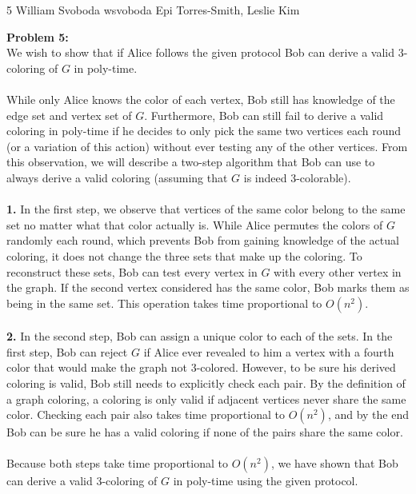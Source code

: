 \documentclass[12pt,letterpaper]{cos340hw}
\begin{document}
           {5}            %
           {William Svoboda}  %
           {wsvoboda}   %
           {Epi Torres-Smith, Leslie Kim} 




\noindent\textbf{Problem 5:}\\
We wish to show that if Alice follows the given protocol Bob can derive a valid 3-coloring of $G$ in 
poly-time.\\\\
While only Alice knows the color of each vertex, Bob still has knowledge of the edge set and vertex set 
of $G$. Furthermore, Bob can still fail to derive a valid coloring in poly-time if he decides to only pick 
the same two vertices each round (or a variation of this action) without ever testing any of the other 
vertices. From this observation, we will describe a two-step algorithm that Bob can use to always 
derive a valid coloring (assuming that $G$ is indeed 3-colorable).\\\\
\noindent\textbf{1.} In the first step, we observe that vertices of the same color belong to the same set 
no matter what that color actually is. While Alice permutes the colors of $G$ randomly each round, which 
prevents Bob from gaining knowledge of the actual coloring, it does not change the three sets that make 
up the coloring. To reconstruct these sets, Bob can test every vertex in $G$ with every other vertex in the 
graph. If the second vertex considered has the same color, Bob marks them as being in the same set. 
This operation takes time proportional to $O(n^2)$.\\\\
\noindent\textbf{2.} In the second step, Bob can assign a unique color to each of the sets. In the first step, 
Bob can reject $G$ if Alice ever revealed to him a vertex with a fourth color that would make the graph not 
3-colored. However, to be sure his derived coloring is valid, Bob still needs to explicitly check each 
pair. By the definition of a graph coloring, a coloring is only valid if adjacent vertices never share the same 
color. Checking each pair also takes time proportional to $O(n^2)$, and by the end Bob can be sure he 
has a valid coloring if none of the pairs share the same color.\\\\
Because both steps take time proportional to $O(n^2)$, we have shown that Bob can derive a valid 
3-coloring of $G$ in poly-time using the given protocol.


\end{document}
